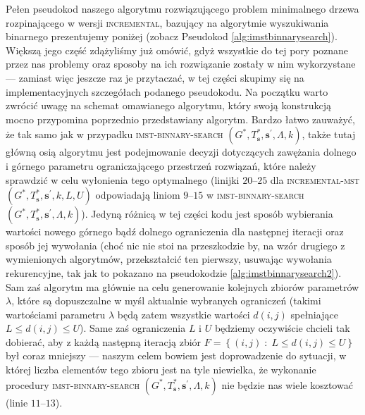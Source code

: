 {Pełen pseudokod naszego algorytmu rozwiązującego problem minimalnego drzewa rozpinającego w wersji \textsc{incremental}, bazujący na algorytmie wyszukiwania binarnego prezentujemy poniżej (zobacz Pseudokod \ref{alg:imstbinnarysearch}). Większą jego część zdążyliśmy już omówić, gdyż wszystkie do tej pory poznane przez nas problemy oraz sposoby na ich rozwiązanie zostały w nim wykorzystane --- zamiast więc jeszcze raz je przytaczać, w tej części skupimy się na implementacyjnych szczegółach podanego pseudokodu. Na początku warto zwrócić uwagę na schemat omawianego algorytmu, który swoją konstrukcją mocno przypomina poprzednio przedstawiany algorytm. Bardzo łatwo zauważyć, że tak samo jak w przypadku \textsc{imst-binnary-search} $\left( G^{\ast}, T^{\ast}_{\textbf{s}}, \textbf{s}^{\prime}, \Lambda, k \right)$, także tutaj główną osią algorytmu jest podejmowanie decyzji dotyczących zawężania dolnego i górnego parametru ograniczającego przestrzeń rozwiązań, które należy sprawdzić w celu wyłonienia tego optymalnego (linijki $20$--$25$ dla \textsc{incremental-mst} $\left( G^{\ast}, T^{\ast}_{\textbf{s}}, \textbf{s}^{\prime}, k, L, U \right)$ odpowiadają liniom $9$--$15$ w \textsc{imst-binnary-search} $\left( G^{\ast}, T^{\ast}_{\textbf{s}}, \textbf{s}^{\prime}, \Lambda, k \right)$). Jedyną różnicą w tej części kodu jest sposób wybierania wartości nowego górnego bądź dolnego ograniczenia dla następnej iteracji oraz sposób jej wywołania (choć nic nie stoi na przeszkodzie by, na wzór drugiego z wymienionych algorytmów, przekształcić ten pierwszy, usuwając wywołania rekurencyjne, tak jak to pokazano na pseudokodzie \ref{alg:imstbinnarysearch2}). Sam zaś algorytm ma głównie na celu generowanie kolejnych zbiorów parametrów $\lambda$, które są dopuszczalne w myśl aktualnie wybranych ograniczeń (takimi wartościami parametru $\lambda$ będą zatem wszystkie wartości $d \left( i, j \right)$ spełniające $L \leqslant d \left( i, j \right) \leqslant U$). Same zaś ograniczenia $L$ i $U$ będziemy oczywiście chcieli tak dobierać, aby z każdą następną iteracją zbiór $F = \left\{ \left( i, j \right) \; : \; L \leqslant d \left( i, j \right) \leqslant U \right\}$ był coraz mniejszy --- naszym celem bowiem jest doprowadzenie do sytuacji, w której liczba elementów tego zbioru jest na tyle niewielka, że wykonanie procedury \textsc{imst-binnary-search} $\left( G^{\ast}, T^{\ast}_{\textbf{s}}, \textbf{s}^{\prime}, \Lambda, k \right)$ nie będzie nas wiele kosztować (linie $11$--$13$). 

}
